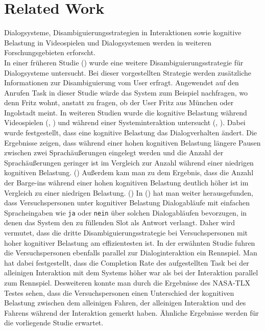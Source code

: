 \documentclass[12pt,a4paper]{scrartcl}
\begin{document}
\newpage
\section{Related Work}

Dialogsysteme, Disambiguierungsstrategien in Interaktionen sowie kognitive Belastung in Videospielen und Dialogsystemen werden in weiteren Forschungsgebieten erforscht. \\
In einer früheren Studie (\cite{idsia}) wurde eine weitere Disambiguierungsstrategie für Dialogsysteme untersucht. Bei dieser vorgestellten Strategie werden zusätzliche Informationen zur Disambiguierung vom User erfragt. Angewendet auf den Anrufen Task in dieser Studie würde das System zum Beispiel nachfragen, wo denn Fritz wohnt, anstatt zu fragen, ob der User Fritz aus München oder Ingolstadt meint.
In weiteren Studien wurde die kognitive Belastung während Videospielen (\cite{CLmmorpg}, \cite{eCLDS}) und während einer Systeminteraktion untersucht (\cite{DbCL}, \cite{eCLDS}). Dabei wurde festgestellt, dass eine kognitive Belastung das Dialogverhalten ändert. Die Ergebnisse zeigen, dass während einer hohen kognitiven Belastung längere Pausen zwischen zwei Sprachäußerungen eingelegt werden und die Anzahl der Sprachäußerungen  geringer ist im Vergleich zur Anzahl während einer niedrigen kognitiven Belastung. (\cite{DbCL}) Außerdem kam man zu dem Ergebnis, dass die Anzahl der Barge-ins während einer hohen kognitiven Belastung deutlich höher ist im Vergleich zu einer niedrigen Belastung. (\cite{eCLDS})
In (\cite{eCLDS}) hat man weiter herausgefunden, dass Versuchspersonen unter kognitiver Belastung Dialogabläufe mit einfachen Spracheingaben wie \texttt{ja} oder \texttt{nein} über solchen Dialogabläufen bevorzugen, in denen das System den zu füllenden Slot als Antwort verlangt. Daher wird vermutet, dass die dritte Disambiguierungsstrategie bei Versuchspersonen mit hoher kognitiver Belastung am effizientesten ist.  In der erwähnten Studie fuhren die Versuchspersonen ebenfalls parallel zur Dialoginteraktion ein Rennspiel. Man hat dabei festgestellt, dass die Completion Rate des aufgestellten Task bei der alleinigen Interaktion mit dem Systems höher war als bei der Interaktion parallel zum Rennspiel. Desweiteren konnte man durch die Ergebnisse des NASA-TLX Testes sehen, dass die Versuchspersonen einen Unterschied der kognitiven Belastung zwischen dem alleinigen Fahren, der alleinigen Interaktion und des Fahrens während der Interaktion gemerkt haben. Ähnliche Ergebnisse werden für die vorliegende Studie erwartet.
\end{document}
